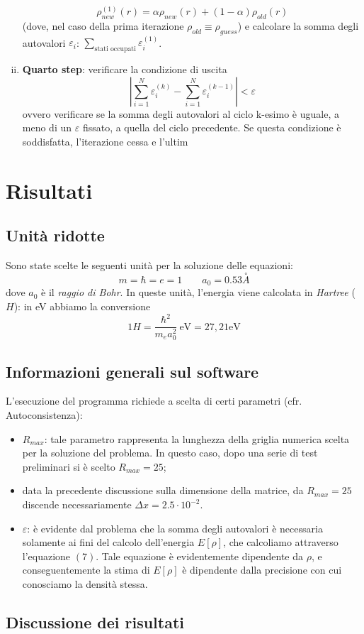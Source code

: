 \documentclass[11pt,a4paper]{article}
\begin{document}
\begin{enumerate}[i.]
\begin{equation}
\rho_{new}^{(1)}(r) = \alpha \rho_{new}(r) + (1-\alpha)\rho_{old}(r)
\end{equation}
(dove, nel caso della prima iterazione $\rho_{old} \equiv \rho_{guess}$) e calcolare la somma degli autovalori $\varepsilon_i$: $\sum_{\text{stati occupati}} \varepsilon_i^{(1)}$.
\item \textbf{Quarto step}: verificare la condizione di uscita
\begin{equation}
\left| \sum_{i=1}^N \varepsilon_i^{(k)} - \sum_{i=1}^N \varepsilon_i^{(k-1)} \right| < \varepsilon
\end{equation}
ovvero verificare se la somma degli autovalori al ciclo k-esimo è uguale, a meno di un $\varepsilon$ fissato, a quella del ciclo precedente. Se questa condizione è soddisfatta, l'iterazione cessa e l'ultim
\end{enumerate}

\section{Risultati}
\subsection{Unità ridotte}
Sono state scelte le seguenti unità per la soluzione delle equazioni: 
\[
m = \hbar = e = 1 \qquad a_0 = 0.53 \overset{\circ}{A}
\]
dove $a_0$ è il \emph{raggio di Bohr}. In queste unità, l'energia viene calcolata in \emph{Hartree} ($H$): in eV abbiamo la conversione
\begin{equation}
1 H = \frac{\hbar^2}{m_e a_0^2} \ \text{eV} = 27,21 \text{eV}
\end{equation}  
\subsection{Informazioni generali sul software}

L'esecuzione del programma richiede a scelta di certi parametri (cfr. Autoconsistenza):
\begin{itemize}
	\item $R_{max}$: tale parametro rappresenta la lunghezza della griglia numerica scelta per la soluzione del problema. In questo caso, dopo una serie di test preliminari si è scelto $R_{max} = 25$;
	\item data la precedente discussione sulla dimensione della matrice, da $R_{max}=25$ discende necessariamente $\Delta x = 2.5 \cdot 10^{-2}$. 
	\item $\varepsilon$: è evidente dal problema che la somma degli autovalori è necessaria solamente ai fini del calcolo dell'energia $E[\rho]$, che calcoliamo attraverso l'equazione $(7)$. Tale equazione è evidentemente dipendente da $\rho$, e conseguentemente la stima di $E[\rho]$ è dipendente dalla precisione con cui conosciamo la densità stessa. 
\end{itemize}
\subsection{Discussione dei risultati}
\end{document}
